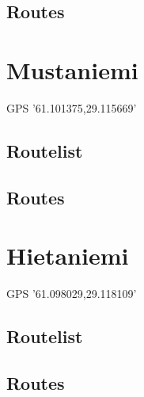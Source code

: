 \documentclass[8pt, a5paper,notitlepage,openany]{report}
\begin{document}
\subsection{Routes}


\clearpage
 \section{Mustaniemi}
 GPS '61.101375,29.115669'
\subsection{Routelist}

\newpage
\subsection{Routes}


\clearpage
 \section{Hietaniemi}
 GPS '61.098029,29.118109'
\subsection{Routelist}

\newpage
\subsection{Routes}


  
% 


 
\end{document}
